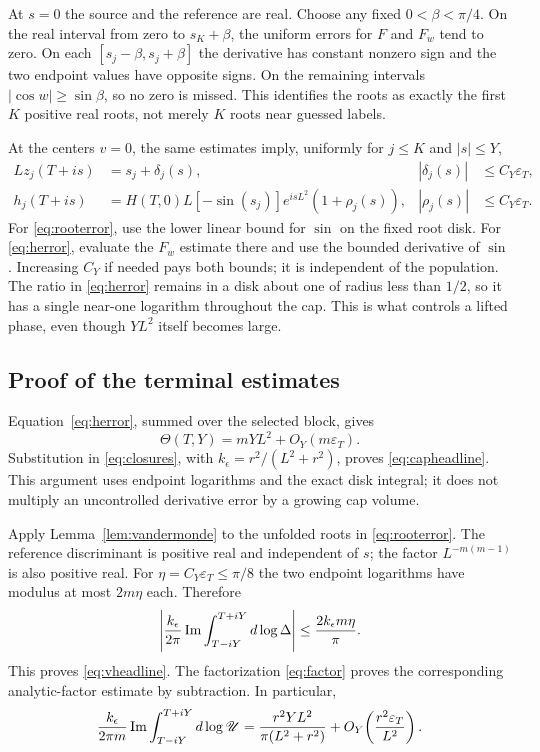 At $s=0$ the source and the reference are real. Choose any fixed
$0<\beta<\pi/4$. On the real interval from zero to $s_K+\beta$,
the uniform errors for $F$ and $F_w$ tend to zero. On each
$[s_j-\beta,s_j+\beta]$ the derivative has constant nonzero
sign and the two endpoint values have opposite signs. On the
remaining intervals $|\cos w|\ge\sin\beta$, so no zero is
missed. This identifies the roots as exactly the first $K$
positive real roots, not merely $K$ roots near guessed labels.

At the centers $v=0$, the same estimates imply, uniformly for
$j\le K$ and $|s|\le Y$,
\begin{align}
 Lz_j(T+is)&=s_j+\delta_j(s),& |\delta_j(s)|&\le C_Y\varepsilon_T,
 \label{eq:rooterror}\\
 h_j(T+is)&=H(T,0)L[-\sin(s_j)]e^{isL^2}(1+\rho_j(s)),&
 |\rho_j(s)|&\le C_Y\varepsilon_T.
 \label{eq:herror}
\end{align}
For \eqref{eq:rooterror}, use the lower linear bound for $\sin$
on the fixed root disk. For \eqref{eq:herror}, evaluate the
$F_w$ estimate there and use the bounded derivative of $\sin$.
Increasing $C_Y$ if needed pays both bounds; it is independent of
the population. The ratio in \eqref{eq:herror} remains in a disk
about one of radius less than $1/2$, so it has a single near-one
logarithm throughout the cap. This is what controls a lifted phase,
even though $YL^2$ itself becomes large.

\subsection{Proof of the terminal estimates}

Equation~\eqref{eq:herror}, summed over the selected block, gives
\begin{equation}
 \Theta(T,Y)=mYL^2+O_Y(m\varepsilon_T).
 \label{eq:thetaerror}
\end{equation}
Substitution in \eqref{eq:closures}, with
$k_\epsilon=r^2/(L^2+r^2)$, proves \eqref{eq:capheadline}.
This argument uses endpoint logarithms and the exact disk integral;
it does not multiply an uncontrolled derivative error by a growing
cap volume.

Apply Lemma~\ref{lem:vandermonde} to the unfolded roots in
\eqref{eq:rooterror}. The reference discriminant is positive real
and independent of $s$; the factor $L^{-m(m-1)}$ is also positive
real. For $\eta=C_Y\varepsilon_T\le\pi/8$ the two endpoint
logarithms have modulus at most $2m\eta$ each. Therefore
\begin{equation}
 \left|\frac{k_\epsilon}{2\pi}
       \operatorname{Im}\int_{T-iY}^{T+iY}d\log\Delta\right|
 \le\frac{2k_\epsilon m\eta}{\pi}.
 \label{eq:vfinite}
\end{equation}
This proves \eqref{eq:vheadline}. The factorization
\eqref{eq:factor} proves the corresponding analytic-factor estimate
by subtraction. In particular,
\begin{equation}
 \frac{k_\epsilon}{2\pi m}
       \operatorname{Im}\int_{T-iY}^{T+iY}d\log\mathscr U
 =\frac{r^2YL^2}{\pi(L^2+r^2)}
       +O_Y\!\left(\frac{r^2\varepsilon_T}{L^2}\right).
 \label{eq:unitbound}
\end{equation}

